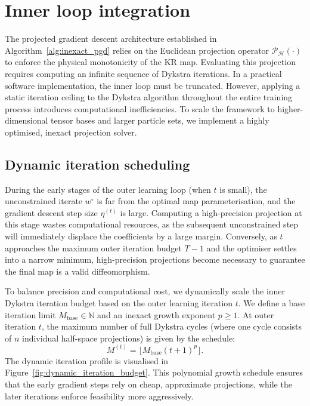 \section{Inner loop integration} \label{sec:inner_loop_integration}

The projected gradient descent architecture established in Algorithm~\ref{alg:inexact_pgd} relies on the Euclidean projection operator $\mathcal{P}_{\mathcal{H}}(\cdot)$ to enforce the physical monotonicity of the KR map. Evaluating this projection requires computing an infinite sequence of Dykstra iterations. In a practical software implementation, the inner loop must be truncated. However, applying a static iteration ceiling to the Dykstra algorithm throughout the entire training process introduces computational inefficiencies. To scale the framework to higher-dimensional tensor bases and larger particle sets, we implement a highly optimised, inexact projection solver.

\subsection{Dynamic iteration scheduling}
During the early stages of the outer learning loop (when $t$ is small), the unconstrained iterate $w^\circ$ is far from the optimal map parameterisation, and the gradient descent step size $\eta^{(t)}$ is large. Computing a high-precision projection at this stage wastes computational resources, as the subsequent unconstrained step will immediately displace the coefficients by a large margin. Conversely, as $t$ approaches the maximum outer iteration budget $T-1$ and the optimiser settles into a narrow minimum, high-precision projections become necessary to guarantee the final map is a valid diffeomorphism.

To balance precision and computational cost, we dynamically scale the inner Dykstra iteration budget based on the outer learning iteration $t$. We define a base iteration limit $M_{\mathrm{base}} \in \mathbb{N}$ and an inexact growth exponent $p \ge 1$. At outer iteration $t$, the maximum number of full Dykstra cycles (where one cycle consists of $n$ individual half-space projections) is given by the schedule:
\begin{equation}
    M^{(t)} = \lfloor M_{\mathrm{base}} (t+1)^p \rfloor.
    \label{eq:dynamic_budget}
\end{equation}
The dynamic iteration profile is visualised in Figure~\ref{fig:dynamic_iteration_budget}. This polynomial growth schedule ensures that the early gradient steps rely on cheap, approximate projections, while the later iterations enforce feasibility more aggressively.


